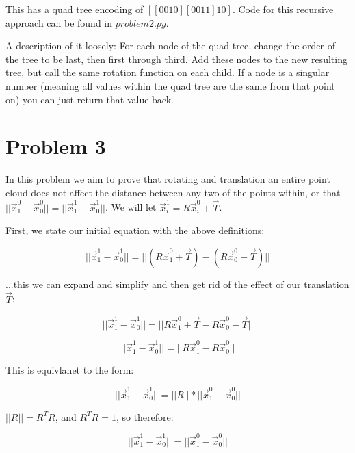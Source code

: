 \documentclass{article}
\begin{document}
\noindent This has a quad tree encoding of $[[0010][0011]10]$. Code for this recursive approach can be found in $problem2.py$.

A description of it loosely: For each node of the quad tree, change the order of the tree to be last, then first through third. Add these nodes to the new resulting tree, but call the same rotation function on each child. If a node is a singular number (meaning all values within the quad tree are the same from that point on) you can just return that value back.

\section*{Problem 3}

In this problem we aim to prove that rotating and translation an entire point cloud does not affect the distance between any two of the points within, or that $||\vec{x}^0_1-\vec{x}^0_0|| = ||\vec{x}^1_1 - \vec{x}^1_0||$. We will let $\vec{x}^1_i=R\vec{x}^0_i + \vec{T}$.

First, we state our initial equation with the above definitions:

\begin{equation}
    ||\vec{x}^1_1 - \vec{x}^1_0|| = ||(R\vec{x}^0_1+\vec{T}) - (R\vec{x}^0_0 + \vec{T})||
\end{equation}

\noindent ...this we can expand and simplify and then get rid of the effect of our translation $\vec{T}$:

\begin{equation}
    ||\vec{x}^1_1 - \vec{x}^1_0|| = ||R\vec{x}^0_1+\vec{T} - R\vec{x}^0_0 - \vec{T}||
\end{equation}

\begin{equation}
    ||\vec{x}^1_1 - \vec{x}^1_0|| = ||R\vec{x}^0_1 - R\vec{x}^0_0||
\end{equation}

\noindent This is equivlanet to the form:

\begin{equation}
    ||\vec{x}^1_1 - \vec{x}^1_0|| = ||R|| * ||\vec{x}^0_1 - \vec{x}^0_0||
\end{equation}

\noindent $||R|| = R^TR$, and $R^TR = 1$, so therefore:

\begin{equation}
    ||\vec{x}^1_1 - \vec{x}^1_0|| = ||\vec{x}^0_1 - \vec{x}^0_0||
\end{equation}
\end{document}
